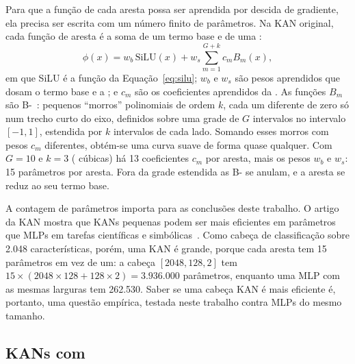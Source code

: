 Para que a função de cada aresta possa ser aprendida por descida de gradiente, ela precisa ser escrita com um número finito de parâmetros. Na KAN original, cada função de aresta é a soma de um termo base e de uma :
\begin{equation}
\phi(x) = w_b\,\mathrm{SiLU}(x) + w_s \sum_{m=1}^{G+k} c_m B_m(x),
\label{eq:kan_spline}
\end{equation}
em que SiLU é a função da Equação~\ref{eq:silu}; $w_b$ e $w_s$ são pesos aprendidos que dosam o termo base e a ; e $c_m$ são os coeficientes aprendidos da . As funções $B_m$ são B-~\cite{deboor1978practical}: pequenos ``morros'' polinomiais de ordem $k$, cada um diferente de zero só num trecho curto do eixo, definidos sobre uma grade de $G$ intervalos no intervalo $[-1, 1]$, estendida por $k$ intervalos de cada lado. Somando esses morros com pesos $c_m$ diferentes, obtém-se uma curva suave de forma quase qualquer. Com $G=10$ e $k=3$ ( cúbicas) há 13 coeficientes $c_m$ por aresta, mais os pesos $w_b$ e $w_s$: 15 parâmetros por aresta. Fora da grade estendida as B- se anulam, e a aresta se reduz ao seu termo base.

A contagem de parâmetros importa para as conclusões deste trabalho. O artigo da KAN mostra que KANs pequenas podem ser mais eficientes em parâmetros que MLPs em tarefas científicas e simbólicas~\cite{liu2024kan}. Como cabeça de classificação sobre 2.048 características, porém, uma KAN é grande, porque cada aresta tem 15 parâmetros em vez de um: a cabeça $[2048, 128, 2]$ tem $15 \times (2048 \times 128 + 128 \times 2) = 3.936.000$ parâmetros, enquanto uma MLP com as mesmas larguras tem 262.530. Saber se uma cabeça KAN é mais eficiente é, portanto, uma questão empírica, testada neste trabalho contra MLPs do mesmo tamanho.

\subsection{KANs com \texorpdfstring{}{Wavelets}}


